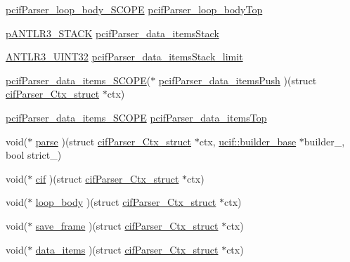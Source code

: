 \begin{DoxyCompactItemize}
\hyperlink{cif_parser_8h_aea2d24aee164ae2f6ee1f5c8e4e3f17f}{pcif\-Parser\-\_\-loop\-\_\-body\-\_\-\-S\-C\-O\-P\-E} \hyperlink{structcif_parser___ctx__struct_ae530c57b20caca4d25d9800ea2661708}{pcif\-Parser\-\_\-loop\-\_\-body\-Top}
\item 
\hyperlink{antlr3interfaces_8h_acc1ac4dd91a4d941b628467ac08c0cea}{p\-A\-N\-T\-L\-R3\-\_\-\-S\-T\-A\-C\-K} \hyperlink{structcif_parser___ctx__struct_a64dda8029ad03eabf86c438584381765}{pcif\-Parser\-\_\-data\-\_\-items\-Stack}
\item 
\hyperlink{antlr3defs_8h_ac41f744abd0fd25144b9eb9d11b1dfd1}{A\-N\-T\-L\-R3\-\_\-\-U\-I\-N\-T32} \hyperlink{structcif_parser___ctx__struct_a1ce1786320c2615b35585ddedebf1fd3}{pcif\-Parser\-\_\-data\-\_\-items\-Stack\-\_\-limit}
\item 
\hyperlink{cif_parser_8h_a9034c1386c9145b1a39af50401219026}{pcif\-Parser\-\_\-data\-\_\-items\-\_\-\-S\-C\-O\-P\-E}($\ast$ \hyperlink{structcif_parser___ctx__struct_a5e1e7b3ca652931cbefae87dac602880}{pcif\-Parser\-\_\-data\-\_\-items\-Push} )(struct \hyperlink{structcif_parser___ctx__struct}{cif\-Parser\-\_\-\-Ctx\-\_\-struct} $\ast$ctx)
\item 
\hyperlink{cif_parser_8h_a9034c1386c9145b1a39af50401219026}{pcif\-Parser\-\_\-data\-\_\-items\-\_\-\-S\-C\-O\-P\-E} \hyperlink{structcif_parser___ctx__struct_acdf4740ef4059a5aed2ecb56ed2d1671}{pcif\-Parser\-\_\-data\-\_\-items\-Top}
\item 
void($\ast$ \hyperlink{structcif_parser___ctx__struct_ae1f6fcfdacaac08cf77d8e469c7be421}{parse} )(struct \hyperlink{structcif_parser___ctx__struct}{cif\-Parser\-\_\-\-Ctx\-\_\-struct} $\ast$ctx, \hyperlink{structucif_1_1builder__base}{ucif\-::builder\-\_\-base} $\ast$builder\-\_\-, bool strict\-\_\-)
\item 
void($\ast$ \hyperlink{structcif_parser___ctx__struct_a63de38cc5898cccdcf530726fb1afff4}{cif} )(struct \hyperlink{structcif_parser___ctx__struct}{cif\-Parser\-\_\-\-Ctx\-\_\-struct} $\ast$ctx)
\item 
void($\ast$ \hyperlink{structcif_parser___ctx__struct_ad44ce35861b1c696536efe669dc03ef4}{loop\-\_\-body} )(struct \hyperlink{structcif_parser___ctx__struct}{cif\-Parser\-\_\-\-Ctx\-\_\-struct} $\ast$ctx)
\item 
void($\ast$ \hyperlink{structcif_parser___ctx__struct_acf04cb95815c5fca16863bf3bdc0c2e1}{save\-\_\-frame} )(struct \hyperlink{structcif_parser___ctx__struct}{cif\-Parser\-\_\-\-Ctx\-\_\-struct} $\ast$ctx)
\item 
void($\ast$ \hyperlink{structcif_parser___ctx__struct_a74c6a5f9c1b64c5c4c5bfc4b0dc4b0dc}{data\-\_\-items} )(struct \hyperlink{structcif_parser___ctx__struct}{cif\-Parser\-\_\-\-Ctx\-\_\-struct} $\ast$ctx)

\end{DoxyCompactItemize}
